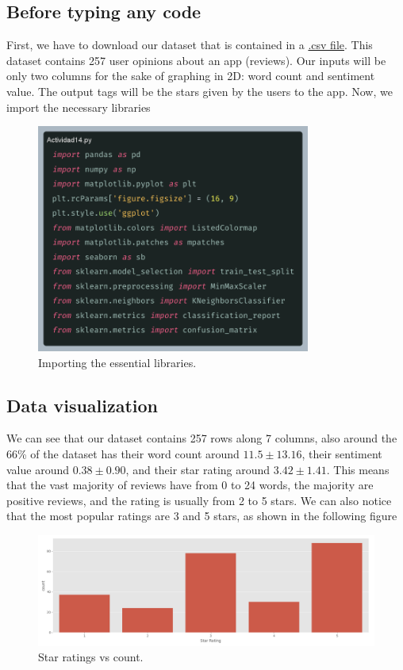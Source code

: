 \documentclass[10pt]{article}
\begin{document}
\subsection{Before typing any code}
First, we have to download our dataset that is contained in a \href{http://www.aprendemachinelearning.com/wp-content/uploads/2018/07/reviews_sentiment.csv}{.csv file}. This dataset contains 257 user opinions about an app (reviews). Our inputs will be only two columns for the sake of graphing in 2D: word count and sentiment value. The output tags will be the stars given by the users to the app. Now, we import the necessary libraries
\begin{figure}[h]
    \centering
    \includegraphics[width=90mm]{2025-03-31-17-28-34.png}
    \caption{Importing the essential libraries.}
\end{figure}

\subsection{Data visualization}
We can see that our dataset contains 257 rows along 7 columns, also around the 66\% of the dataset has their word count around $11.5 \pm 13.16$, their sentiment value around $0.38 \pm 0.90$, and their star rating around $3.42 \pm 1.41$. This means that the vast majority of reviews have from 0 to 24 words, the majority are positive reviews, and the rating is usually from 2 to 5 stars. We can also notice that the most popular ratings are 3 and 5 stars, as shown in the following figure
\begin{figure}[h]
    \centering
    \includegraphics[width=130mm]{star_rating.png}
    \caption{Star ratings vs count.}
\end{figure}
\end{document}
